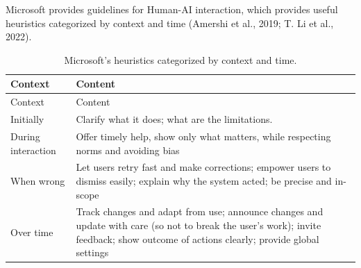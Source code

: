 \documentclass[
  12pt,
  letterpaper,
  DIV=11,
  numbers=noendperiod]{scrartcl}
\begin{document}
Microsoft provides guidelines for Human-AI interaction, which provides
useful heuristics categorized by context and time (Amershi et al., 2019;
T. Li et al., 2022).

\def\pandoctableshortcapt{Microsoft's Heuristics}

\begin{longtable}[]{@{}
  >{\raggedright\arraybackslash}p{}
  >{\raggedright\arraybackslash}p{}@{}}
\caption[Microsoft's Heuristics]{Microsoft's heuristics categorized by
context and time.}\tabularnewline
\toprule\noalign{}
\begin{minipage}[b]{\linewidth}\raggedright
Context
\end{minipage} & \begin{minipage}[b]{\linewidth}\raggedright
Content
\end{minipage} \\
\midrule\noalign{}
\endfirsthead
\toprule\noalign{}
\begin{minipage}[b]{\linewidth}\raggedright
Context
\end{minipage} & \begin{minipage}[b]{\linewidth}\raggedright
Content
\end{minipage} \\
\midrule\noalign{}
\endhead
\bottomrule\noalign{}
\endlastfoot
Initially & Clarify what it does; what are the limitations. \\
During interaction & Offer timely help, show only what matters, while
respecting norms and avoiding bias \\
When wrong & Let users retry fast and make corrections; empower users to
dismiss easily; explain why the system acted; be precise and in-scope \\
Over time & Track changes and adapt from use; announce changes and
update with care (so not to break the user's work); invite feedback;
show outcome of actions clearly; provide global settings \\
\end{longtable}

\let\pandoctableshortcapt\relax
\end{document}

